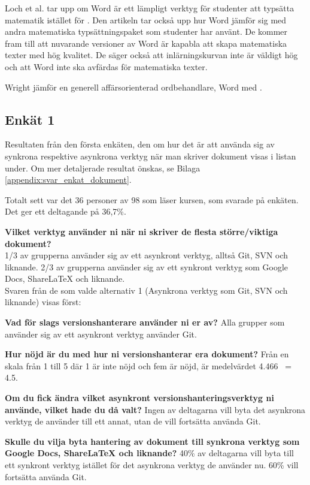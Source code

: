 Loch et al. \cite{loch2014master} tar upp om Word är ett lämpligt verktyg för studenter att typsätta matematik istället för \latex. Den artikeln tar också upp hur Word jämför sig med andra matematiska typsättningspaket som studenter har använt. De kommer fram till att nuvarande versioner av Word är kapabla att skapa matematiska texter med hög kvalitet. De säger också att inlärningskurvan inte är väldigt hög och att Word inte ska avfärdas för matematiska texter.  

Wright \cite{wright2010technical} jämför en generell affärsorienterad ordbehandlare, Word med \latex.  


\subsection{Enkät 1}
Resultaten från den första enkäten, den om hur det är att använda sig av synkrona respektive asynkrona verktyg när man skriver dokument visas i listan under. Om mer detaljerade resultat önskas, se Bilaga \ref{appendix:svar_enkat_dokument}.

Totalt sett var det 36 personer av 98 som läser kursen, som svarade på enkäten. Det ger ett deltagande på 36,7\%.

\textbf{Vilket verktyg använder ni när ni skriver de flesta större/viktiga dokument?}
\\1/3 av grupperna använder sig av ett asynkront verktyg, alltså Git, SVN och liknande. 2/3 av grupperna använder sig av ett synkront verktyg som Google Docs, ShareLaTeX och liknande.
\\Svaren från de som valde alternativ 1 (Asynkrona verktyg som Git, SVN och liknande) visas först:

\textbf{Vad för slags versionshanterare använder ni er av?}
Alla grupper som använder sig av ett asynkront verktyg använder Git.

\textbf{Hur nöjd är du med hur ni versionshanterar era dokument?}
Från en skala från 1 till 5 där 1 är inte nöjd och fem är nöjd, är medelvärdet 4.466 ~= 4.5.

\textbf{Om du fick ändra vilket asynkront versionshanteringsverktyg ni använde, vilket hade du då valt?}
Ingen av deltagarna vill byta det asynkrona verktyg de använder till ett annat, utan de vill fortsätta använda Git.

\textbf{Skulle du vilja byta hantering av dokument till synkrona verktyg som Google Docs, ShareLaTeX och liknande?}
40\% av deltagarna vill byta till ett synkront verktyg istället för det asynkrona verktyg de använder nu. 60\% vill fortsätta använda Git.

